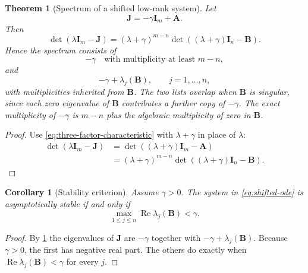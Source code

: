 \documentclass[11pt]{article}
\newcommand{\I}{\mathbf{I}}
\newcommand{\mat}[1]{\mathbf{#1}}
\newcommand{\RePart}{\operatorname{Re}}
\newtheorem{theorem}{Theorem}[section]
\newtheorem{corollary}[corollary]{Corollary}
\theoremstyle{definition}
\theoremstyle{remark}
\begin{document}
\begin{theorem}[Spectrum of a shifted low-rank system]
\label{thm:shifted-spectrum}
Let
\[
  \mat{J}=-\gamma\I_m+\mat{A}.
\]
Then
\begin{equation}
  \det(\lambda\I_m-\mat{J})
  =
  (\lambda+\gamma)^{m-n}
  \det\!\left((\lambda+\gamma)\I_n-\mat{B}\right).
  \label{eq:shifted-characteristic}
\end{equation}
Hence the spectrum consists of
\begin{equation}
  -\gamma
  \quad\text{with multiplicity at least }m-n,
  \label{eq:shifted-inactive-eigs}
\end{equation}
and
\begin{equation}
  -\gamma+\lambda_j(\mat{B}),
  \qquad j=1,\dots,n,
  \label{eq:shifted-active-eigs}
\end{equation}
with multiplicities inherited from \(\mat{B}\). The two lists overlap when \(\mat{B}\) is singular, since each zero eigenvalue of \(\mat{B}\) contributes a further copy of \(-\gamma\). The exact multiplicity of \(-\gamma\) is \(m-n\) plus the algebraic multiplicity of zero in \(\mat{B}\).
\end{theorem}

\begin{proof}
Use \cref{eq:three-factor-characteristic} with \(\lambda+\gamma\) in place of \(\lambda\):
\begin{align*}
  \det(\lambda\I_m-\mat{J})
  &=\det((\lambda+\gamma)\I_m-\mat{A})\\
  &=(\lambda+\gamma)^{m-n}
    \det((\lambda+\gamma)\I_n-\mat{B}).
\end{align*}
\end{proof}

\begin{corollary}[Stability criterion]
\label{cor:stability-criterion}
Assume \(\gamma>0\). The system in \cref{eq:shifted-ode} is asymptotically stable if and only if
\begin{equation}
  \max_{1\leq j\leq n}
  \RePart\lambda_j(\mat{B})<\gamma.
  \label{eq:stability-criterion}
\end{equation}
\end{corollary}

\begin{proof}
By \cref{thm:shifted-spectrum} the eigenvalues of \(\mat{J}\) are \(-\gamma\) together with \(-\gamma+\lambda_j(\mat{B})\). Because \(\gamma>0\), the first has negative real part. The others do exactly when \(\RePart\lambda_j(\mat{B})<\gamma\) for every \(j\).
\end{proof}
\end{document}
